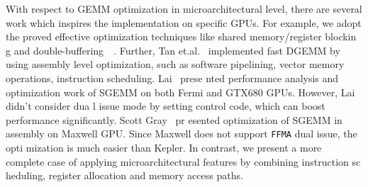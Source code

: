 With respect to GEMM optimization in microarchitectural level, there are several work which inspires the implementation 
on specific GPUs. For example, we adopt the proved effective optimization techniques like shared memory/register blockin
g and double-buffering~\cite{volkov}~\cite{tan}. Further, Tan et.al.~\cite{tan} implemented fast DGEMM by using assembly
 level optimization, such as software pipelining, vector memory operations, instruction scheduling. Lai~\cite{lai} prese
nted performance analysis and optimization work of SGEMM on both Fermi and GTX680 GPUs. However, Lai didn't consider dua
l issue mode by setting control code, which can boost performance significantly. Scott Gray~\cite{nervana_sgemm_wiki} pr
esented optimization of SGEMM in assembly on Maxwell GPU. Since Maxwell does not support {\tt FFMA} dual issue, the opti
mization is much easier than
Kepler. In contrast, we present a more complete case of applying microarchitectural features by combining instruction sc
heduling, register allocation and memory access paths. 
